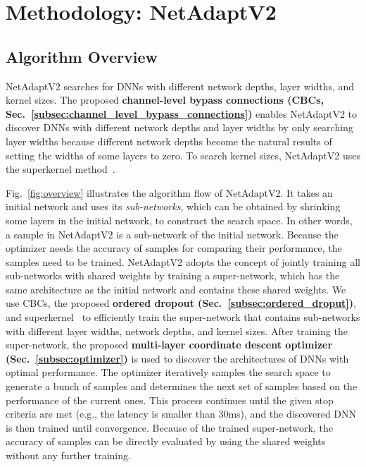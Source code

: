 \section{Methodology: NetAdaptV2}

\subsection{Algorithm Overview}

NetAdaptV2 searches for DNNs with different network depths, layer widths, and kernel sizes. The proposed \textbf{channel-level bypass connections (CBCs, Sec.~\ref{subsec:channel_level_bypass_connections})} enables NetAdaptV2 to discover DNNs with different network depths and layer widths by only searching layer widths because different network depths become the natural results of setting the widths of some layers to zero. To search kernel sizes, NetAdaptV2 uses the superkernel method~\cite{stamoulis2019singlepath, stamoulis2019singlepathautoml, yu2020bignas}.

Fig.~\ref{fig:overview} illustrates the algorithm flow of NetAdaptV2. It takes an initial network and uses its \emph{sub-networks}, which can be obtained by shrinking some layers in the initial network, to construct the search space. In other words, a sample in NetAdaptV2 is a sub-network of the initial network. Because the optimizer needs the accuracy of samples for comparing their performance, the samples need to be trained. NetAdaptV2 adopts the concept of jointly training all sub-networks with shared weights by training a super-network, which has the same architecture as the initial network and contains these shared weights. We use CBCs, the proposed \textbf{ordered dropout (Sec.~\ref{subsec:ordered_droput})}, and superkernel~\cite{stamoulis2019singlepath, stamoulis2019singlepathautoml, yu2020bignas} to efficiently train the super-network that contains sub-networks with different layer widths, network depths, and kernel sizes. After training the super-network, the proposed \textbf{multi-layer coordinate descent optimizer (Sec.~\ref{subsec:optimizer})} is used to discover the architectures of DNNs with optimal performance. The optimizer iteratively samples the search space to generate a bunch of samples and determines the next set of samples based on the performance of the current ones. This process continues until the given stop criteria are met (e.g., the latency is smaller than 30ms), and the discovered DNN is then trained until convergence. Because of the trained super-network, the accuracy of samples can be directly evaluated by using the shared weights without any further training.

